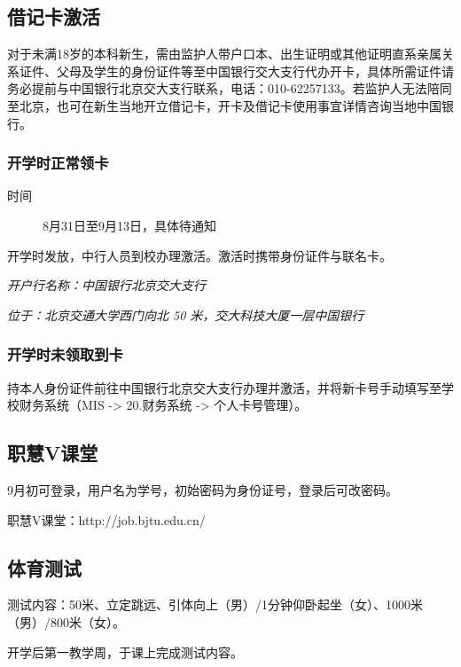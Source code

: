 \documentclass[a4paper]{ctexart}
\begin{document}
\subsection{借记卡激活}

对于未满18岁的本科新生，需由监护人带户口本、出生证明或其他证明直系亲属关系证件、父母及学生的身份证件等至中国银行交大支行代办开卡，具体所需证件请务必提前与中国银行北京交大支行联系，电话：010-62257133。若监护人无法陪同至北京，也可在新生当地开立借记卡，开卡及借记卡使用事宜详情咨询当地中国银行。

\subsubsection{开学时正常领卡}

\begin{description}
	\item[时间] 8月31日至9月13日，具体待通知
\end{description}

开学时发放，中行人员到校办理激活。激活时携带身份证件与联名卡。

\textit{开户行名称：中国银行北京交大支行}

\textit{位于：北京交通大学西门向北 50 米，交大科技大厦一层中国银行}
	
\subsubsection{开学时未领取到卡}

持本人身份证件前往中国银行北京交大支行办理并激活，并将新卡号手动填写至学校财务系统（MIS -> 20.财务系统 -> 个人卡号管理）。

\subsection{职慧V课堂}

9月初可登录，用户名为学号，初始密码为身份证号，登录后可改密码。

职慧V课堂：http://job.bjtu.edu.cn/

\subsection{体育测试}

测试内容：50米、立定跳远、引体向上（男）/1分钟仰卧起坐（女）、1000米（男）/800米（女）。

开学后第一教学周，于课上完成测试内容。

\newpage
\end{document}
